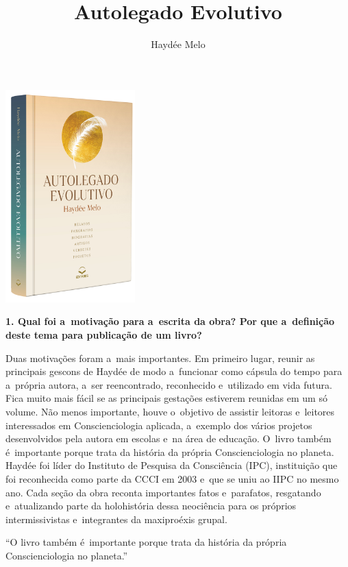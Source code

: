\documentclass{gescons}
\author{Haydée Melo}
\title{Autolegado Evolutivo}
\begin{document}
    \makeentrevistatitle

    \begin{multicols}{3}

\begin{center}
    \includegraphics[width=5cm]{articles/entrevista/mockups/Haydee_Melo.png}
\end{center}


\textbf{1. Qual foi a~motivação para a~escrita da obra? Por que a~definição deste tema para publicação de um livro?}


Duas motivações foram a~mais importantes. Em primeiro lugar, reunir as principais gescons de Haydée de modo a~funcionar como cápsula do tempo para a~própria autora, a~ser reencontrado, reconhecido e~utilizado em vida futura. Fica muito mais fácil se as principais gestações estiverem reunidas em um só volume. Não menos importante, houve o~objetivo de assistir leitoras e~leitores interessados em Conscienciologia aplicada, a~exemplo dos vários projetos desenvolvidos pela autora em escolas e~na área de educação. O~livro também é~importante porque trata da história da própria Conscienciologia no planeta. Haydée foi líder do Instituto de Pesquisa da Consciência (IPC), instituição que foi reconhecida como parte da CCCI em 2003 e~que se uniu ao IIPC no mesmo ano. Cada seção da obra reconta importantes fatos e~parafatos, resgatando e~atualizando parte da holohistória dessa neociência para os próprios intermissivistas e~integrantes da maxiproéxis grupal.

\begin{pullquote}
``O livro também é~importante porque trata da história da própria Conscienciologia no planeta.''
\end{pullquote}


\end{multicols}
\end{document}
